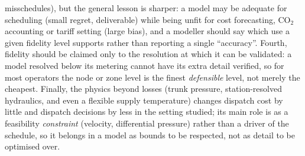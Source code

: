 \documentclass[a4paper,fleqn]{cas-sc}
\begin{document}
misschedules), but the general lesson is sharper: a model may be adequate for scheduling
(small regret, deliverable) while being unfit for cost forecasting, CO$_2$ accounting or tariff
setting (large bias), and a modeller should say which use a given fidelity level supports rather
than reporting a single ``accuracy''. Fourth, fidelity should be claimed only to the resolution
at which it can be validated: a model resolved below its metering cannot have its extra detail
verified, so for most operators the node or zone level is the finest \emph{defensible} level,
not merely the cheapest. Finally, the physics beyond losses (trunk pressure, station-resolved
hydraulics, and even a flexible supply temperature) changes dispatch cost by little and
dispatch decisions by less in the setting studied; its main role is as a feasibility
\emph{constraint} (velocity, differential pressure) rather than a driver of the schedule, so it
belongs in a model as bounds to be respected, not as detail to be optimised over.

\end{document}
